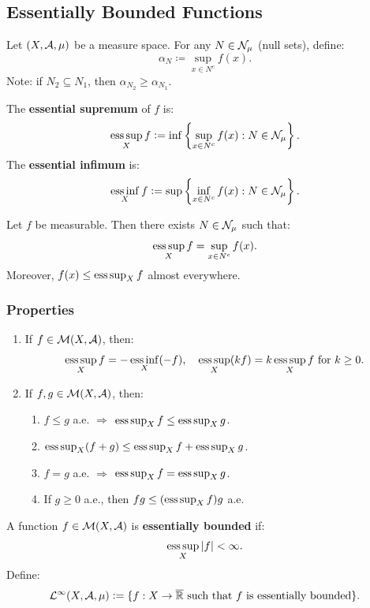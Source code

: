 \subsection{Essentially Bounded Functions}

Let $(X,\mathcal{A},\mu)$ be a measure space. For any $N \in \mathcal{N}_\mu$ (null sets), define:
\[
\alpha_N \coloneqq \sup_{x \in N^c} f(x).
\]
Note: if $N_2 \subseteq N_1$, then $\alpha_{N_2} \geq \alpha_{N_1}$.

\begin{definition}
The \textbf{essential supremum} of $f$ is:
\[
\operatorname*{ess\,sup}_X f \mathrel{\mathop:}= \inf \left\{ \sup_{x \in N^c} f(x) : N \in \mathcal{N}_\mu \right\}.
\]
The \textbf{essential infimum} is:
\[
\operatorname*{ess\,inf}_X f \mathrel{\mathop:}= \sup \left\{ \inf_{x \in N^c} f(x) : N \in \mathcal{N}_\mu \right\}.
\]
\end{definition}

\begin{proposition}
Let $f$ be measurable. Then there exists $N \in \mathcal{N}_\mu$ such that:
\[
\operatorname*{ess\,sup}_X f = \sup_{x \in N^c} f(x).
\]
Moreover, $f(x) \leq \operatorname*{ess\,sup}_X f$ almost everywhere.
\end{proposition}

\clearpage
\subsubsection{Properties}
\begin{enumerate}
    \item If $f \in \mathcal{M}(X,\mathcal{A})$, then:
    \[
    \operatorname*{ess\,sup}_X f = - \operatorname*{ess\,inf}_X (-f), \quad \operatorname*{ess\,sup}_X (kf) = k \operatorname*{ess\,sup}_X f \text{ for } k \geq 0.
    \]
    \item If $f,g \in \mathcal{M}(X,\mathcal{A})$, then:
    \begin{enumerate}
        \item $f \leq g$ a.e. $\Rightarrow$ $\operatorname*{ess\,sup}_X f \leq \operatorname*{ess\,sup}_X g$.
        \item $\operatorname*{ess\,sup}_X (f+g) \leq \operatorname*{ess\,sup}_X f + \operatorname*{ess\,sup}_X g$.
        \item $f = g$ a.e. $\Rightarrow$ $\operatorname*{ess\,sup}_X f = \operatorname*{ess\,sup}_X g$.
        \item If $g \geq 0$ a.e., then $fg \leq (\operatorname*{ess\,sup}_X f) g$ a.e.
    \end{enumerate}
\end{enumerate}

\begin{definition}
A function $f \in \mathcal{M}(X,\mathcal{A})$ is \textbf{essentially bounded} if:
\[
\operatorname*{ess\,sup}_X |f| < \infty.
\]
Define:
\[
\mathcal{L}^\infty(X,\mathcal{A},\mu) \mathrel{\mathop:}= \{ f:X \to \overline{\mathbb{R}} \text{ such that } f \text{ is essentially bounded} \}.
\]
\end{definition}

